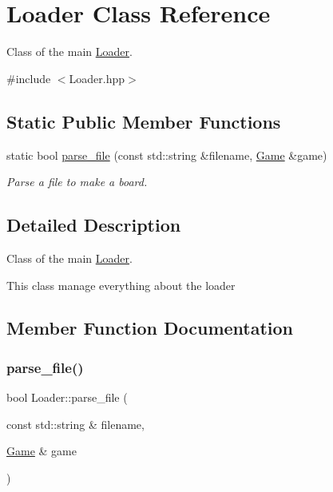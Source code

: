 \hypertarget{classLoader}{}\section{Loader Class Reference}
\label{classLoader}


Class of the main \hyperlink{classLoader}{Loader}.  




{\ttfamily \#include $<$Loader.\+hpp$>$}

\subsection*{Static Public Member Functions}
\begin{DoxyCompactItemize}
\item 
static bool \hyperlink{classLoader_a22ccbf4c21a330d16e37b99948d43ddb}{parse\+\_\+file} (const std\+::string \&filename, \hyperlink{classGame}{Game} \&game)
\begin{DoxyCompactList}\small\item\em Parse a file to make a board. \end{DoxyCompactList}\end{DoxyCompactItemize}


\subsection{Detailed Description}
Class of the main \hyperlink{classLoader}{Loader}. 

This class manage everything about the loader 

\subsection{Member Function Documentation}
\mbox{\label{classLoader_a22ccbf4c21a330d16e37b99948d43ddb}} 
\subsubsection{\texorpdfstring{parse\+\_\+file()}{parse\_file()}}
{\footnotesize\ttfamily bool Loader\+::parse\+\_\+file (\begin{DoxyParamCaption}\item[{const std\+::string \&}]{filename,  }\item[{\hyperlink{classGame}{Game} \&}]{game }\end{DoxyParamCaption})\hspace{0.3cm}{\ttfamily [static]}}



